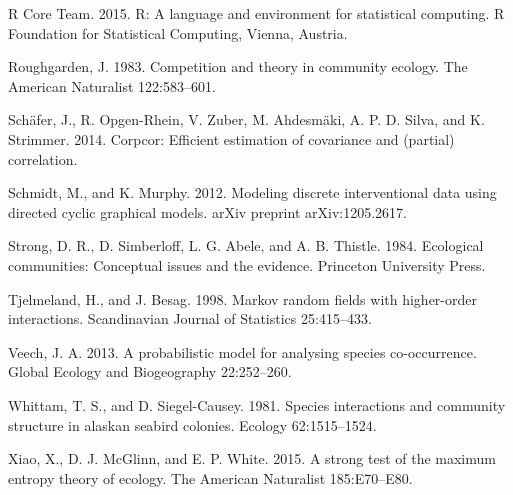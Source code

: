 \documentclass[12pt,]{article}
\begin{document}
\begin{spacing}{1.9}
\begin{flushleft}
R Core Team. 2015. R: A language and environment for statistical
computing. R Foundation for Statistical Computing, Vienna, Austria.

Roughgarden, J. 1983. Competition and theory in community ecology. The
American Naturalist 122:583--601.

Schäfer, J., R. Opgen-Rhein, V. Zuber, M. Ahdesmäki, A. P. D. Silva, and
K. Strimmer. 2014. Corpcor: Efficient estimation of covariance and
(partial) correlation.

Schmidt, M., and K. Murphy. 2012. Modeling discrete interventional data
using directed cyclic graphical models. arXiv preprint arXiv:1205.2617.

Strong, D. R., D. Simberloff, L. G. Abele, and A. B. Thistle. 1984.
Ecological communities: Conceptual issues and the evidence. Princeton
University Press.

Tjelmeland, H., and J. Besag. 1998. Markov random fields with
higher-order interactions. Scandinavian Journal of Statistics
25:415--433.

Veech, J. A. 2013. A probabilistic model for analysing species
co-occurrence. Global Ecology and Biogeography 22:252--260.

Whittam, T. S., and D. Siegel-Causey. 1981. Species interactions and
community structure in alaskan seabird colonies. Ecology 62:1515--1524.

Xiao, X., D. J. McGlinn, and E. P. White. 2015. A strong test of the
maximum entropy theory of ecology. The American Naturalist 185:E70--E80.
\end{flushleft}
\end{spacing}
\end{document}
